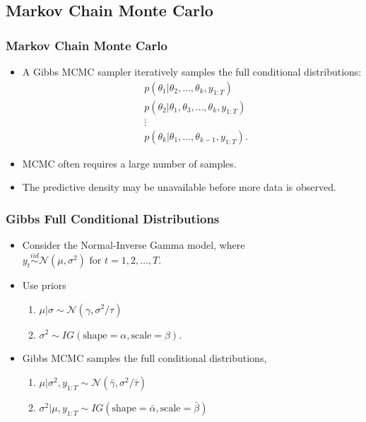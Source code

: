 \documentclass{beamer}\usepackage[]{graphicx}\usepackage[]{color}
\begin{document}
\begin{frame}
\section{Markov Chain Monte Carlo}
\frametitle{Markov Chain Monte Carlo}
\begin{itemize}
\item A Gibbs MCMC sampler iteratively samples the full conditional distributions:
\begin{align}
&p(\theta_1 | \theta_2, \dots, \theta_k, y_{1:T}) \nonumber \\
&p(\theta_2 | \theta_1, \theta_3, \dots, \theta_k, y_{1:T}) \nonumber \\
&\vdots \nonumber \\
&p(\theta_k | \theta_1, \dots, \theta_{k-1}, y_{1:T}). \nonumber
\end{align}
\item MCMC often requires a large number of samples.
\item The predictive density may be unavailable before more data is observed.
\end{itemize}
\end{frame}


\begin{frame}
\frametitle{Gibbs Full Conditional Distributions}
\begin{itemize}
\item Consider the Normal-Inverse Gamma model, where $y_t \overset{iid}{\sim} \mathcal{N}\left(\mu, \sigma^2\right) \mbox{ for } t = 1, 2, \dots, T$. 
\item Use priors
\begin{enumerate}
\item $\mu | \sigma \sim \mathcal{N}\left(\gamma, \sigma^2/\tau\right)$
\item $\sigma^2 \sim IG\left(\mbox{shape} = \alpha, \mbox{scale} = \beta\right)$.
\end{enumerate}
\vspace{2mm}
\item Gibbs MCMC samples the full conditional distributions,
\begin{enumerate}
\item $\mu | \sigma^2, y_{1:T} \sim \mathcal{N}\left(\bar{\gamma}, \sigma^2 / \bar{\tau}\right)$
\item $\sigma^2 | \mu, y_{1:T} \sim IG \left(\mbox{shape} = \bar{\alpha}, \mbox{scale} = \bar{\beta} \right)$
\end{enumerate}
\end{itemize}
\end{frame}
\end{document}
